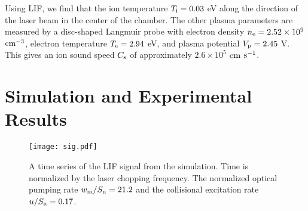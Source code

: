 \documentclass[aip,pop,reprint]{revtex4-1}
\begin{document}
Using LIF, we find that the ion temperature $T_\textup{i}=0.03$ eV along the direction of the laser beam in the center of the chamber. The other plasma parameters are measured by a disc-shaped Langmuir probe with electron density $n_\textup{e}=2.52 \times 10^9$ $\textup{cm}^{-3}$, electron temperature $T_\textup{e}=2.94$ eV, and plasma potential $V_\textup{p}=2.45$ V. This gives an ion sound speed $C_\textup{s}$ of approximately $2.6 \times 10^5$ $\textup{cm}$  $\textup{s}^{-1}$.

\section{Simulation and Experimental Results}
\label{sec:results}

\begin{figure}
\begin{center}
\texttt{[image: sig.pdf]}
\caption{A time series of the LIF signal from the simulation. Time is normalized by the laser chopping frequency. The normalized optical pumping rate $w_\textup{m}/S_\textup{n}=21.2$ and the collisional excitation rate $u/S_\textup{n}=0.17$.}
\label{fig:timeseries}
\end{center}
\end{figure}

\end{document}
